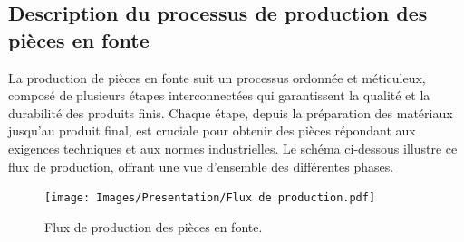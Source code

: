 \documentclass[12pt]{article}
\begin{document}
\newpage

\subsection{Description du processus de production des pièces en fonte}

La production de pièces en fonte suit un processus ordonnée et méticuleux, 
composé de plusieurs étapes interconnectées qui garantissent la qualité 
et la durabilité des produits finis. Chaque étape, depuis la préparation 
des matériaux jusqu'au produit final, est cruciale pour obtenir des pièces 
répondant aux exigences techniques et aux normes industrielles. 
Le schéma ci-dessous illustre ce flux de production, offrant une vue 
d'ensemble des différentes phases. 

\begin{figure}[H]
    \centering
    \begin{adjustbox}{width=1.3\textwidth,height=0.8\textheight,center}
        \texttt{[image: Images/Presentation/Flux de production.pdf]}
    \end{adjustbox}
    \caption{Flux de production des pièces en fonte.}
    \label{fig:flux-production}
\end{figure}
\end{document}
